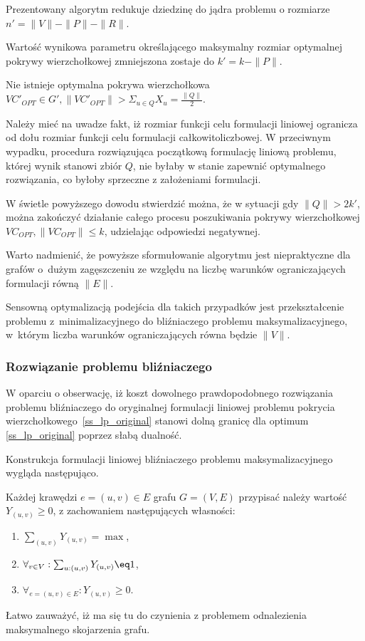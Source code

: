 Prezentowany algorytm redukuje dziedzinę do jądra problemu  o rozmiarze
$n\prime=\|V\|-\|P\|-\|R\|$.

Wartość wynikowa parametru określającego maksymalny rozmiar optymalnej pokrywy
wierzchołkowej zmniejszona zostaje do $k\prime=k-\|P\|$.

\begin{theorem}
  Nie istnieje optymalna pokrywa wierzchołkowa $VC\prime_{OPT}\in G\prime,\|VC\prime_{OPT}\|>\Sigma_{u\in Q}X_u=\frac{\|Q\|}{2}$.
\end{theorem}
\begin{bproof}
  Należy mieć na uwadze fakt, iż rozmiar funkcji celu formulacji liniowej 
  ogranicza od dołu rozmiar funkcji celu formulacji całkowitoliczbowej.
  W przeciwnym wypadku, procedura rozwiązująca początkową formulację liniową
  problemu, której wynik stanowi zbiór $Q$, nie byłaby w stanie zapewnić
  optymalnego rozwiązania, co byłoby sprzeczne z założeniami formulacji.
\end{bproof}

W świetle powyższego dowodu stwierdzić można, że w sytuacji gdy
$\|Q\|>2k\prime$, można zakończyć działanie całego procesu poszukiwania pokrywy
wierzchołkowej $VC_{OPT}, \|VC_{OPT}\|\leq k$, udzielając odpowiedzi negatywnej.

Warto nadmienić, że powyższe sformułowanie algorytmu jest niepraktyczne dla
grafów o~dużym zagęszczeniu ze względu na liczbę warunków ograniczających 
formulacji równą $\|E\|$.

Sensowną optymalizacją podejścia dla takich przypadków jest przekształcenie
problemu z~minimalizacyjnego do bliźniaczego problemu maksymalizacyjnego, 
w~którym liczba warunków ograniczających równa będzie $\|V\|$.

\subsubsection{Rozwiązanie problemu bliźniaczego}

W oparciu o obserwację, iż koszt dowolnego prawdopodobnego rozwiązania problemu
bliźniaczego do oryginalnej formulacji liniowej problemu pokrycia
wierzchołkowego~\ref{ss_lp_original} stanowi dolną granicę dla optimum
\ref{ss_lp_original} poprzez słabą dualność. 

Konstrukcja formulacji liniowej bliźniaczego problemu maksymalizacyjnego wygląda
następująco.

Każdej krawędzi $e=(u,v) \in E$ grafu $G=(V,E)$ przypisać należy wartość
$Y_(u,v) \geq 0$, z zachowaniem następujących własności:
\begin{enumerate}
  \item $\sum_{(u,v)}Y_{(u,v)} = \max$,
  \item $\forall_{v \in V}:\sum_{u:(u,v)}Y_{(u,v)}\eq 1$,
  \item $\forall_{e=(u,v) \in E}: Y_{(u,v)} \geq 0$.
\end{enumerate}

Łatwo zauważyć, iż ma się tu do czynienia z problemem odnalezienia maksymalnego
skojarzenia grafu.
